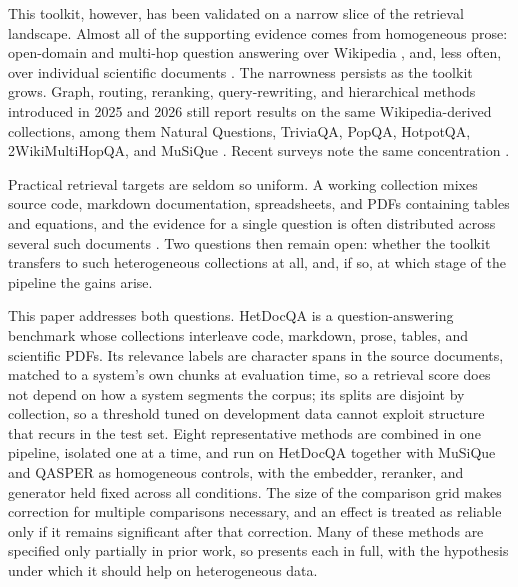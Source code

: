 \documentclass[10pt,twocolumn]{article}
\begin{document}
This toolkit, however, has been validated on a narrow slice of the retrieval
landscape. Almost all of the supporting evidence comes from homogeneous prose:
open-domain and multi-hop question answering over Wikipedia
\cite{kwiatkowski2019nq,yang2018hotpotqa,trivedi2022musique,ho2020twowiki}, and,
less often, over individual scientific documents \cite{dasigi2021qasper,pang2022quality}.
The narrowness persists as the toolkit grows. Graph, routing, reranking,
query-rewriting, and hierarchical methods introduced in 2025 and 2026 still
report results on the same Wikipedia-derived collections, among them Natural
Questions, TriviaQA, PopQA, HotpotQA, 2WikiMultiHopQA, and MuSiQue
\cite{wang2025hypergraphrag,du2026arag,chen2025logicrag,shi2026reasoningtrees,%
zhang2025ragrouter,guo2025routerag,wang2025infogainrag,zhao2025parallelsearch,%
cao2025outofstyle}. Recent surveys note the same concentration
\cite{oche2025ragreview,sharma2025ragsurvey}.

Practical retrieval targets are seldom so uniform. A working collection mixes
source code, markdown
documentation, spreadsheets, and PDFs containing tables and equations, and the
evidence for a single question is often distributed across several such
documents \cite{luo2025globalrag}. Two questions then remain open: whether the
toolkit transfers to such heterogeneous collections at all, and, if so, at which
stage of the pipeline the gains arise.

This paper addresses both questions. HetDocQA is a question-answering benchmark
whose
collections interleave code, markdown, prose, tables, and scientific PDFs.
Its relevance labels are character spans in the source documents, matched to a
system's own chunks at evaluation time, so a retrieval score does not depend on
how a system segments the corpus; its splits are disjoint by collection, so a
threshold tuned on development data cannot exploit structure that recurs in the
test set. Eight representative methods are combined in one pipeline, isolated
one at a time, and run on HetDocQA together with MuSiQue and QASPER as homogeneous
controls, with the embedder, reranker, and generator held fixed across all
conditions. The size of the comparison grid makes correction for multiple
comparisons necessary, and an effect is treated as reliable only if it remains
significant after that correction.
Many of these methods are specified only partially in prior work, so
 presents each in full, with the hypothesis under which it
should help on heterogeneous data.
\end{document}
